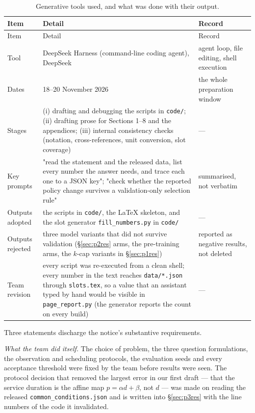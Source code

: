 \documentclass{swmcmthesis}
\begin{document}
\begin{longtable}{p{}p{}p{}}
\caption{Generative tools used, and what was done with their output.}
\label{tab:aitools}\\
\toprule
Item & Detail & Record \\
\midrule
\endfirsthead
\toprule
Item & Detail & Record \\
\midrule
\endhead
\bottomrule
\endfoot
Tool & DeepSeek Harness (command-line coding agent), DeepSeek & agent loop, file editing, shell execution \\
Dates & 18--20 November 2026 & the whole preparation window \\
Stages & (i) drafting and debugging the scripts in \texttt{code/};
(ii) drafting prose for Sections 1--8 and the appendices;
(iii) internal consistency checks (notation, cross-references, unit
conversion, slot coverage) & --- \\
Key prompts & "read the statement and the released data, list every number the
answer needs, and trace each one to a JSON key"; "check whether the reported
policy change survives a validation-only selection rule" & summarised, not verbatim \\
Outputs adopted & the scripts in \texttt{code/}, the LaTeX skeleton, and the
slot generator \texttt{fill\_numbers.py} in \texttt{code/} & --- \\
Outputs rejected & three model variants that did not survive validation
(\S\ref{sec:p2res} arms, the pre-training arms, the $k$-cap variants in
\S\ref{sec:p1res}) & reported as negative results, not deleted \\
Team revision & every script was re-executed from a clean shell; every number
in the text reaches \texttt{data/*.json} through \texttt{slots.tex}, so a value
that an assistant typed by hand would be visible in \texttt{page\_report.py}
(the generator reports the count on every build) & --- \\
\end{longtable}

Three statements discharge the notice's substantive requirements.

\emph{What the team did itself.} The choice of problem, the three question
formulations, the observation and scheduling protocols, the evaluation seeds and
every acceptance threshold were fixed by the team before results were seen. The
protocol decision that removed the largest error in our first draft --- that the
service duration is the affine map $p=\alpha d+\beta$, not $d$ --- was made on
reading the released \texttt{common\_conditions.json} and is written into
\S\ref{sec:p3res} with the line numbers of the code it invalidated.
\end{document}
